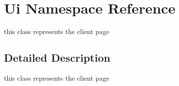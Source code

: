 \hypertarget{namespaceUi}{}\section{Ui Namespace Reference}
\label{namespaceUi}


this class represents the client page  




\subsection{Detailed Description}
this class represents the client page 